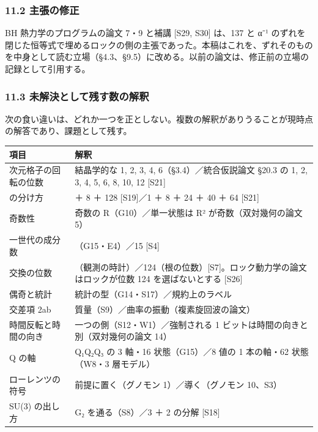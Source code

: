 \documentclass[
  a4paper,
]{ltjsarticle}
\newcounter{none} %
\begin{document}
\subsubsection{11.2 主張の修正}\label{ux4e3bux5f35ux306eux4feeux6b63}

BH 熱力学のプログラムの論文 7・9 と補講 {[}S29, S30{]} は、137 と α⁻¹
のずれを閉じた恒等式で埋めるロックの側の主張であった。本稿はこれを、ずれそのものを中身として読む立場（§4.3、§9.5）に改める。以前の論文は、修正前の立場の記録として引用する。

\subsubsection{11.3
未解決として残す数の解釈}\label{ux672aux89e3ux6c7aux3068ux3057ux3066ux6b8bux3059ux6570ux306eux89e3ux91c8}

次の食い違いは、どれか一つを正としない。複数の解釈がありうることが現時点の解答であり、課題として残す。

{\def\LTcaptype{none} %
\begin{longtable}[]{@{}
  >{\raggedright\arraybackslash}p{}
  >{\raggedright\arraybackslash}p{}@{}}
\toprule\noalign{}
\begin{minipage}[b]{\linewidth}\raggedright
項目
\end{minipage} & \begin{minipage}[b]{\linewidth}\raggedright
解釈
\end{minipage} \\
\midrule\noalign{}
\endhead
\bottomrule\noalign{}
\endlastfoot
4 次元格子の回転の位数 & 結晶学的な 1, 2, 3, 4, 6（§3.4）／統合仮説論文
§20.3 の 1, 2, 3, 4, 5, 6, 8, 10, 12 {[}S21{]} \\
137 の分け方 & 1 ＋ 8 ＋ 128 {[}S19{]}／1 ＋ 8 ＋ 24 ＋ 40 ＋ 64
{[}S21{]} \\
奇数性 & 奇数の R（G10）／単一状態は R² が奇数（双対幾何の論文 5） \\
一世代の成分数 & 16（G15・E4）／15 {[}S4{]} \\
交換の位数 &
248（観測の時計）／124（根の位数）{[}S7{]}。ロック動力学の論文はロックが位数
124 を選ばないとする {[}S26{]} \\
偶奇と統計 & 統計の型（G14・S17）／規約上のラベル \\
交差項 2ab & 質量（S9）／曲率の振動（複素旋回波の論文） \\
時間反転と時間の向き & 一つの側（S12・W1）／強制される 1
ビットは時間の向きと別（双対幾何の論文 14） \\
Q の軸 & Q₁Q₂Q₃ の 3 軸・16 状態（G15）／8 値の 1 本の軸・62 状態（W8・3
層モデル） \\
ローレンツの符号 & 前提に置く（グノモン 1）／導く（グノモン 10、S3） \\
SU(3) の出し方 & G₂ を通る（S8）／3 ＋ 2 の分解 {[}S18{]} \\
\end{longtable}
}
\end{document}
